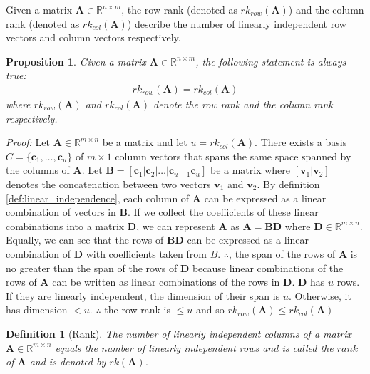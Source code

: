 \documentclass[a4paper,12pt]{book}
\newcommand{\matrx}[1]{\bm{#1}}
\newcommand{\vectr}[1]{\textbf{#1}}
\newcommand{\real}{\mathbb{R}}
\newcommand{\italic}[1]{\textit{#1}}
\newcommand{\rrank}[1]{rk_{row}(\matrx{#1})}
\newcommand{\crank}[1]{rk_{col}(\matrx{#1})}
\newtheorem{definition}{Definition}[section]
\newtheorem{proposition}{Proposition}[section]
\begin{document}
	Given a matrix $ \matrx{A} \in \real^{n \times m} $, the row rank (denoted as $ \rrank{A} $) and the column rank (denoted as $ \crank{A} $) describe the number of linearly independent row vectors and column vectors respectively.
	
	\begin{proposition}
		\normalfont Given a matrix $ \matrx{A} \in \real^{n \times m}$, the following statement is always true:
		\begin{align}
			\rrank{A} = \crank{A}
			\label{eq:row_rank_col_rank}
		\end{align}
		where $ \rrank{A} $ and $ \crank{A} $ denote the row rank and the column rank respectively.
		\label{prop:row_rank_col_rank}
	\end{proposition}
	
	\noindent\italic{Proof:}
	Let $ \matrx{A} \in \real^{m \times n}$ be a matrix and let $ u = \crank{A} $. There exists a basis $ C = \{\vectr{c}_1, \ldots, \vectr{c}_u\} $ of $ m \times 1 $ column vectors that spans the same space spanned by the columns of $ \vectr{A} $. 
	Let $ \matrx{B} = [\vectr{c}_1 | \vectr{c}_2 | \ldots | \vectr{c}_{u - 1} \vectr{c}_u] $ be a matrix where $ [\vectr{v}_1 | \vectr{v}_2] $ denotes the concatenation between two vectors $ \vectr{v}_1 $ and $ \vectr{v}_2 $. By definition \ref{def:linear_independence}, each column of $ \matrx{A} $ can be expressed as a linear combination of vectors in $ \matrx{B} $. If we collect the coefficients of these linear combinations into a matrix $ \matrx{D} $, we can represent $ \matrx{A} $ as $ \matrx{A} = \matrx{BD} $ where $ \matrx{D} \in \real^{m \times n}$. Equally, we can see that the rows of $ \matrx{BD} $ can be expressed as a linear combination of $ \matrx{D} $ with coefficients taken from $ B $. $ \therefore $, the span of the rows of $ \matrx{A} $ is no greater than the span of the rows of $ \matrx{D} $ because linear combinations of the rows of $ \matrx{A} $ can be written as linear combinations of the rows in $ \matrx{D} $. $ \matrx{D} $ has $ u $ rows. If they are linearly independent, the dimension of their span is $ u $. Otherwise, it has dimension $ < u $. $ \therefore $ the row rank is $ \leq u $ and so $ \rrank{A} \leq \crank{A} $
	
	\begin{definition}[Rank]
		\normalfont The number of linearly independent columns of a matrix $\textbf{A} \in \mathbb{R}^{m \times n}$ equals the number of linearly independent rows and is called the $\textit{rank}$ of $\textbf{A}$ and is denoted by $rk(\textbf{A})$.
	\end{definition}
	
	\printbibliography
\end{document}
